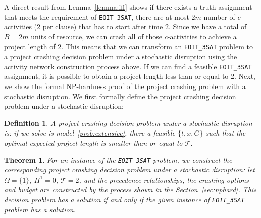 \documentclass[11pt]{article}
\newtheorem{theorem}{Theorem}
\newtheorem{definition}{Definition}
\newcommand{\noi}{\noindent}
\begin{document}
	\noi A direct result from Lemma~\ref{lemma:iff} shows if there exists a truth assignment that meets the requirement of \verb|EOIT_3SAT|, there are at most \(2m\) number of \(c\)-activities (2 per clause) that has to start after time \(2\). Since we have a total of \(B = 2m\) units of resource, we can crash all of those \(c\)-activities to achieve a project length of \(2\). This means that we can transform an \verb|EOIT_3SAT| problem to a project crashing decision problem under a stochastic disruption using the activity network construction process above. If we can find a feasible \verb|EOIT_3SAT| assignment, it is possible to obtain a project length less than or equal to 2. Next, we show the formal NP-hardness proof of the project crashing problem with a stochastic disruption. We first formally define the project crashing decision problem under a stochastic disruption:
	\begin{definition}
		A project crashing decision problem under a stochastic disruption is: if we solve is model~\ref{prob:extensive}, there a feasible \(\{t,x,G\}\) such that the optimal expected project length is smaller than or equal to \(\mathcal{T}\).
	\end{definition}
	\begin{theorem}\label{thm:npcomplete}
		For an instance of the \verb|EOIT_3SAT| problem, we construct the corresponding project crashing decision problem under a stochastic disruption: let \(\Omega = \{1\}\), \(H^1 = 0\), \(\mathcal{T} = 2\), and the precedence relationships, the crashing options and budget are constructed by the process shown in the Section~\ref{sec:nphard}. This decision problem has a solution if and only if the given instance of \verb|EOIT_3SAT| problem has a solution.
	\end{theorem}
\end{document}
